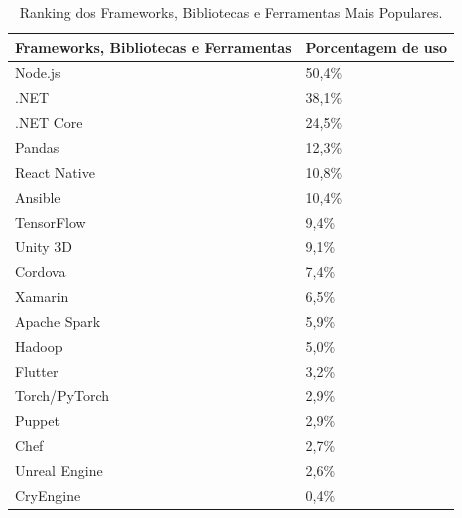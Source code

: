 \begin{table}[htb]
\ABNTEXfontereduzida
\caption[Ranking dos Frameworks, Bibliotecas e Ferramentas Mais Populares]{Ranking dos Frameworks, Bibliotecas e Ferramentas Mais Populares.}
\label{tab-stack-overflow-framework-tools}
\begin{tabular}{p{5cm}|p{4cm}}
   \textbf{Frameworks, Bibliotecas e Ferramentas} & \textbf{Porcentagem de uso}  \\
    \hline
    Node.js & 50,4\%  \\
    \hline
    .NET & 38,1\%  \\
    \hline
    .NET Core & 24,5\%  \\
    \hline
    Pandas & 12,3\%  \\
    \hline
    React Native & 10,8\%  \\
    \hline
    Ansible & 10,4\%  \\
    \hline
    TensorFlow & 9,4\%  \\
    \hline
    Unity 3D & 9,1\%  \\
    \hline
    Cordova & 7,4\%  \\
    \hline
    Xamarin & 6,5\%  \\
    \hline
    Apache Spark & 5,9\%  \\
    \hline
    Hadoop & 5,0\%  \\
    \hline
    Flutter & 3,2\%  \\
    \hline
    Torch/PyTorch & 2,9\%  \\
    \hline
    Puppet & 2,9\%  \\
    \hline
    Chef & 2,7\%  \\
    \hline
    Unreal Engine & 2,6\%  \\
    \hline
    CryEngine & 0,4\%  \\
    
\end{tabular}
\end{table}


